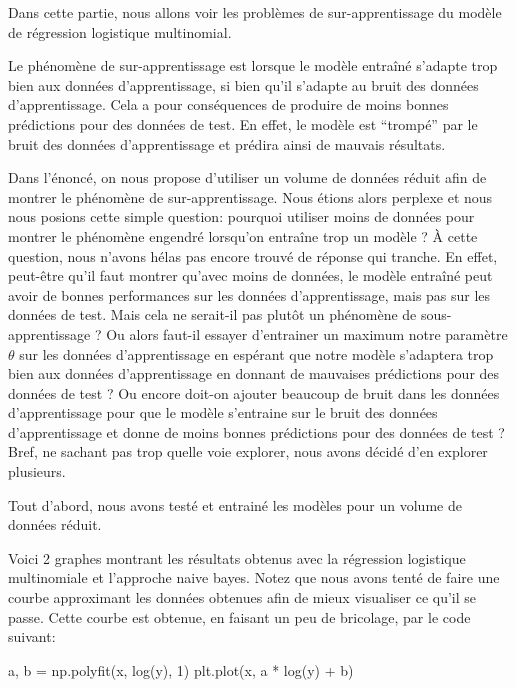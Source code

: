 \documentclass[
]{article}
\newenvironment{Shaded}{}{}
\newcommand{\DecValTok}[1]{\textcolor[rgb]{0.25,0.63,0.44}{#1}}
\newcommand{\NormalTok}[1]{#1}
\newcommand{\OperatorTok}[1]{\textcolor[rgb]{0.40,0.40,0.40}{#1}}
\begin{document}
Dans cette partie, nous allons voir les problèmes de sur-apprentissage
du modèle de régression logistique multinomial.

Le phénomène de sur-apprentissage est lorsque le modèle entraîné
s'adapte trop bien aux données d'apprentissage, si bien qu'il s'adapte
au bruit des données d'apprentissage. Cela a pour conséquences de
produire de moins bonnes prédictions pour des données de test. En effet,
le modèle est ``trompé'' par le bruit des données d'apprentissage et
prédira ainsi de mauvais résultats.

Dans l'énoncé, on nous propose d'utiliser un volume de données réduit
afin de montrer le phénomène de sur-apprentissage. Nous étions alors
perplexe et nous nous posions cette simple question: pourquoi utiliser
moins de données pour montrer le phénomène engendré lorsqu'on entraîne
trop un modèle ? À cette question, nous n'avons hélas pas encore trouvé
de réponse qui tranche. En effet, peut-être qu'il faut montrer qu'avec
moins de données, le modèle entraîné peut avoir de bonnes performances
sur les données d'apprentissage, mais pas sur les données de test. Mais
cela ne serait-il pas plutôt un phénomène de sous-apprentissage ? Ou
alors faut-il essayer d'entrainer un maximum notre paramètre \(\theta\)
sur les données d'apprentissage en espérant que notre modèle s'adaptera
trop bien aux données d'apprentissage en donnant de mauvaises
prédictions pour des données de test ? Ou encore doit-on ajouter
beaucoup de bruit dans les données d'apprentissage pour que le modèle
s'entraine sur le bruit des données d'apprentissage et donne de moins
bonnes prédictions pour des données de test ? Bref, ne sachant pas trop
quelle voie explorer, nous avons décidé d'en explorer plusieurs.

Tout d'abord, nous avons testé et entrainé les modèles pour un volume de
données réduit.

Voici 2 graphes montrant les résultats obtenus avec la régression
logistique multinomiale et l'approche naive bayes. Notez que nous avons
tenté de faire une courbe approximant les données obtenues afin de mieux
visualiser ce qu'il se passe. Cette courbe est obtenue, en faisant un
peu de bricolage, par le code suivant:

\begin{Shaded}
\begin{Highlighting}[]
\NormalTok{a, b }\OperatorTok{=}\NormalTok{ np.polyfit(x, log(y), }\DecValTok{1}\NormalTok{)}
\NormalTok{plt.plot(x, a }\OperatorTok{*}\NormalTok{ log(y) }\OperatorTok{+}\NormalTok{ b)}
\end{Highlighting}
\end{Shaded}
\end{document}
